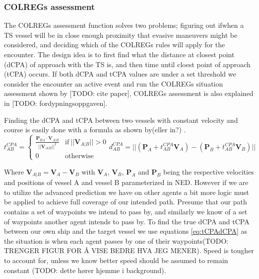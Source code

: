 \subsubsection{COLREGs assessment}
The COLREGs assessment function solves two problems; figuring out if\/when a TS vessel will be in close enough proximity that evasive maneuvers might be considered,
and deciding which of the COLREGs rules will apply for the encounter. The design idea is to first find what the distance at closest point (dCPA) of approach with the TS is, and then
time until cloest point of approach (tCPA) occurs. If both dCPA and tCPA values are under a set threshold we consider the encounter an active event and run the
COLREGs situation assessment shown by [TODO: cite paper], COLREGs assessment is also explained in [TODO: fordypningsoppgaven].

Finding the dCPA and tCPA between two vessels with constant velocity and course is easily done with a formula as shown by(eller in?) \cite{Kufoalor2018}.
\begin{subequations}    \label{eq:tCPAdCPA}
\begin{equation}
    t_{AB}^{CPA} = 
    \begin{cases}
      \frac{\textbf{P}_{BA} \cdot \textbf{V}_{A|B}}{||\textbf{V}_{A|B}||^2} & \text{if}\ ||\textbf{V}_{A|B}|| > 0 \\
      0 & \text{otherwise}
    \end{cases}
\end{equation}
\begin{equation}
    d_{AB}^{CPA} = ||(\textbf{P}_A + t_{AB}^{CPA} \textbf{V}_A) - (\textbf{P}_B + t_{AB}^{CPA} \textbf{V}_B)||
\end{equation}
\end{subequations}

Where $\textbf{V}_{A|B} = \textbf{V}_A - \textbf{V}_B$ with $\textbf{V}_A$, $\textbf{V}_B$, $\textbf{P}_A$ and $\textbf{P}_B$ being the respective
velocities and positions of vessel A and vessel B parameterized in NED. However if we are to utilize the advanced prediction we have on other agents a bit more logic must be applied
to achieve full coverage of our intended path. Presume that our path contains a set of waypoints we intend to pass by, and similarly we know of a set of waypoints another agent intends to
pass by. To find the true dCPA and tCPA between our own ship and the target vessel we use equations \ref{eq:tCPAdCPA} as the situation is when each agent passes by one of their
waypoints(TODO: TRENGER FIGUR FOR Å VISE BEDRE HVA JEG MENER).  Speed is tougher to account for, unless we know better speed should be assumed to remain constant (TODO: dette hører hjemme i background).

